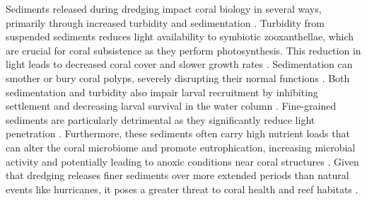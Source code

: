 \documentclass[preprint,12pt,authoryear]{elsarticle}
\begin{document}


Sediments released during dredging impact coral biology in several ways, primarily through increased turbidity and sedimentation \citep{erftemeijer2012environmental,jones2015effects}. Turbidity from suspended sediments reduces light availability to symbiotic zooxanthellae, which are crucial for coral subsistence as they perform photosynthesis. This reduction in light leads to decreased coral cover and slower growth rates \citep{kendall1983effects, rogers1990responses, anthony1999tank, hennige2008photoacclimation}. Sedimentation can smother or bury coral polyps, severely disrupting their normal functions \citep{erftemeijer2012environmental, jones2015effects, jones2019sediment}. Both sedimentation and turbidity also impair larval recruitment by inhibiting settlement and decreasing larval survival in the water column \citep{jones2015effects}. Fine-grained sediments are particularly detrimental as they significantly reduce light penetration \citep{storlazzi2015influence, fourney2017additive}. Furthermore, these sediments often carry high nutrient loads that can alter the coral microbiome and promote eutrophication, increasing microbial activity and potentially leading to anoxic conditions near coral structures \citep{rosales2019oceanographic, wittenberg1992effects, weber2012mechanisms}. Given that dredging releases finer sediments over more extended periods than natural events like hurricanes, it poses a greater threat to coral health and reef habitats \citep{cunning2019extensive}.
\end{document}
